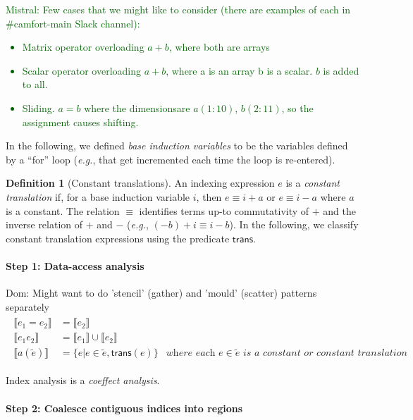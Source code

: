 \documentclass[9pt]{sigplanconf}
\newcommand{\dnote}[1]{\textcolor{darkpurple}{Dom: #1}}
\newcommand{\mnote}[1]{\textcolor{darkgreen}{Mistral: #1}}
\newcounter{block}
\theoremstyle{definition}
\newtheorem{definition}[block]{Definition}
\newcommand{\eg}{\emph{e.g.}}
\newcommand{\interp}[1]{\llbracket{#1}\rrbracket}
\begin{document}
\mnote{Few cases that we might like to consider (there are examples
    of each in \#camfort-main Slack channel): 
  \begin{itemize}
    \item Matrix operator overloading $a + b$, where both are arrays
    \item Scalar operator overloading $a + b$, where a is an array b is a 
      scalar. $b$ is added to all.
    \item Sliding. $a = b$ where the dimensionsare $a(1:10)$, $b(2:11)$,
      so the assignment causes shifting.
  \end{itemize}
}

In the following, we defined
\emph{base induction variables} to be the variables
 defined by a ``for'' loop (\eg{}, that get incremented each time the
loop is re-entered). 

\begin{definition}[Constant translations]
An indexing expression $e$ is a \emph{constant translation} if,
for a base induction variable $i$, then $e \equiv i + a$ or $e \equiv i - a$ 
where $a$ is a constant. The relation $\equiv$ identifies terms
up-to commutativity of $+$ and the inverse
relation of $+$ and $-$ (\eg{}, $(-b) + i \equiv i - b$). 
In the following, we classify constant translation expressions 
using the predicate $\textsf{trans}$.
\end{definition}

\paragraph{Step 1: Data-access analysis}

\dnote{Might want to do 'stencil' (gather) and 'mould' (scatter)
  patterns separately}
\begin{align*}
\begin{array}{lll}
\interp{e_1 = e_2}    & = \interp{e_2} \\
\interp{e_1 e_2}      & = \interp{e_1} \cup \interp{e_2} \\
\interp{a(\tilde{e})} & = \{e | e \in \tilde{e}, \textsf{trans}(e)\} & \textit{where each $e \in
                                          \tilde{e}$ is a constant or constant translation}
\end{array}
\end{align*}

Index analysis is a \emph{coeffect analysis}.

\paragraph{Step 2: Coalesce contiguous indices into regions}
\end{document}
